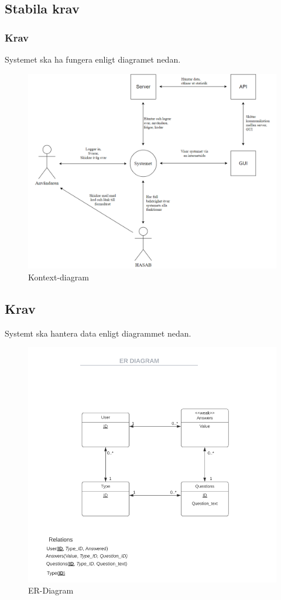 \documentclass{article}
\begin{document}
    \subsection{Stabila krav}
    \subsubsection{Krav}
    Systemet ska ha fungera enligt diagramet nedan.
    
    \begin{figure}[h!]
    \includegraphics[width=150mm]{Kontextdiagram.png}
    \caption{Kontext-diagram}
    \end{figure}
    
    \newpage
    \subsection{Krav}
    Systemt ska hantera data enligt diagrammet nedan.
       \begin{figure}[h!]
    
    \includegraphics[width=150mm]{ERDIAGRAM.png}
    \caption{ER-Diagram}
    \end{figure}
    
\end{document}
